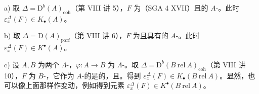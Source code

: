 a) 取 $\Delta=\mathrm D^b(A)_{\mathrm{coh}}$（第 VIII 讲 5），$F$ 为（SGA 4 XVII）且的 $A$-。此时 $\varepsilon_x^\Delta(F)\in K_\bullet(A)$。

b) 取 $\Delta=\mathrm D(A)_{\mathrm{parf}}$（第 VIII 讲 6），$F$ 为且具有的 $A$-。此时 $\varepsilon_x^\Delta(F)\in K^\bullet(A)$。

c) 设 $A,B$ 为两个 $\Lambda$-，$\varphi:A\longrightarrow B$ 为 $\Lambda$-。取 $\Delta=\mathrm D^b(B\ \mathrm{rel}\ A)_{\mathrm{coh}}$（第 VIII 讲 10），$F$ 为 $B$-，它作为 $A$-的是的，且。得到 $\varepsilon_x^\Delta(F)\in K_\bullet(B\ \mathrm{rel}\ A)$。显然，也可以像上面那样作变动，例如得到元素 $\varepsilon_x^\Delta(F)\in K^\bullet(B\ \mathrm{rel}\ A)$。


